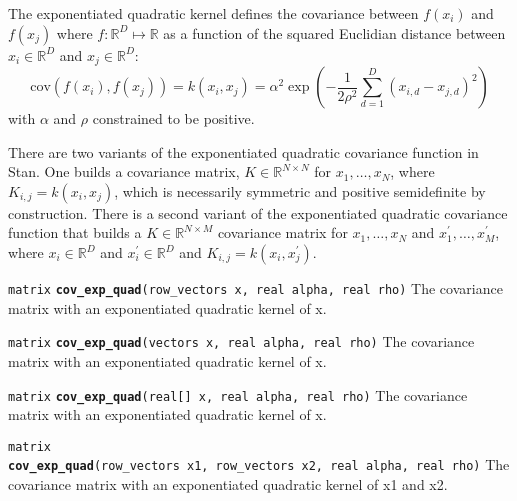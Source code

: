 \documentclass[
  10pt,
]{book}
\begin{document}
The exponentiated quadratic kernel defines the covariance between
\(f(x_i)\) and \(f(x_j)\) where \(f\colon \mathbb{R}^D \mapsto \mathbb{R}\)
as a function of the squared Euclidian distance between \(x_i \in \mathbb{R}^D\) and \(x_j \in \mathbb{R}^D\): \[   \text{cov}(f(x_i),
f(x_j)) = k(x_i, x_j) = \alpha^2 \exp \left(         -
\dfrac{1}{2\rho^2} \sum_{d=1}^D (x_{i,d} - x_{j,d})^2 \right) \] with
\(\alpha\) and \(\rho\) constrained to be positive.

There are two variants of the exponentiated quadratic covariance
function in Stan. One builds a covariance matrix, \(K \in \mathbb{R}^{N \times N}\) for \(x_1, \dots, x_N\), where \(K_{i,j} = k(x_i, x_j)\), which
is necessarily symmetric and positive semidefinite by construction.
There is a second variant of the exponentiated quadratic covariance
function that builds a \(K \in \mathbb{R}^{N \times M}\) covariance
matrix for \(x_1, \dots, x_N\) and \(x^\prime_1, \dots, x^\prime_M\),
where \(x_i \in \mathbb{R}^D\) and \(x^\prime_i \in \mathbb{R}^D\) and
\(K_{i,j} = k(x_i, x^\prime_j)\).


\texttt{matrix} \textbf{\texttt{cov\_exp\_quad}}\texttt{(row\_vectors\ x,\ real\ alpha,\ real\ rho)}\newline
The covariance matrix with an exponentiated quadratic kernel of x.


\texttt{matrix} \textbf{\texttt{cov\_exp\_quad}}\texttt{(vectors\ x,\ real\ alpha,\ real\ rho)}\newline
The covariance matrix with an exponentiated quadratic kernel of x.


\texttt{matrix} \textbf{\texttt{cov\_exp\_quad}}\texttt{(real{[}{]}\ x,\ real\ alpha,\ real\ rho)}\newline
The covariance matrix with an exponentiated quadratic kernel of x.


\texttt{matrix} \textbf{\texttt{cov\_exp\_quad}}\texttt{(row\_vectors\ x1,\ row\_vectors\ x2,\ real\ alpha,\ real\ rho)}\newline
The covariance matrix with an exponentiated quadratic kernel of x1 and
x2.
\end{document}
